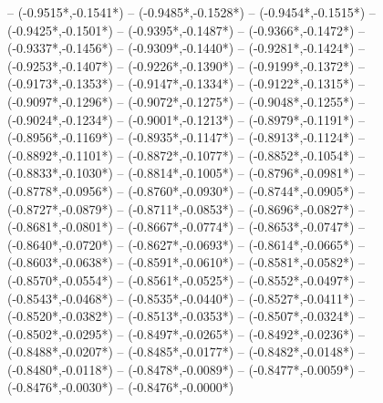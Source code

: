 {	-- ({-0.9515*\dx},{-0.1541*\dy})
	-- ({-0.9485*\dx},{-0.1528*\dy})
	-- ({-0.9454*\dx},{-0.1515*\dy})
	-- ({-0.9425*\dx},{-0.1501*\dy})
	-- ({-0.9395*\dx},{-0.1487*\dy})
	-- ({-0.9366*\dx},{-0.1472*\dy})
	-- ({-0.9337*\dx},{-0.1456*\dy})
	-- ({-0.9309*\dx},{-0.1440*\dy})
	-- ({-0.9281*\dx},{-0.1424*\dy})
	-- ({-0.9253*\dx},{-0.1407*\dy})
	-- ({-0.9226*\dx},{-0.1390*\dy})
	-- ({-0.9199*\dx},{-0.1372*\dy})
	-- ({-0.9173*\dx},{-0.1353*\dy})
	-- ({-0.9147*\dx},{-0.1334*\dy})
	-- ({-0.9122*\dx},{-0.1315*\dy})
	-- ({-0.9097*\dx},{-0.1296*\dy})
	-- ({-0.9072*\dx},{-0.1275*\dy})
	-- ({-0.9048*\dx},{-0.1255*\dy})
	-- ({-0.9024*\dx},{-0.1234*\dy})
	-- ({-0.9001*\dx},{-0.1213*\dy})
	-- ({-0.8979*\dx},{-0.1191*\dy})
	-- ({-0.8956*\dx},{-0.1169*\dy})
	-- ({-0.8935*\dx},{-0.1147*\dy})
	-- ({-0.8913*\dx},{-0.1124*\dy})
	-- ({-0.8892*\dx},{-0.1101*\dy})
	-- ({-0.8872*\dx},{-0.1077*\dy})
	-- ({-0.8852*\dx},{-0.1054*\dy})
	-- ({-0.8833*\dx},{-0.1030*\dy})
	-- ({-0.8814*\dx},{-0.1005*\dy})
	-- ({-0.8796*\dx},{-0.0981*\dy})
	-- ({-0.8778*\dx},{-0.0956*\dy})
	-- ({-0.8760*\dx},{-0.0930*\dy})
	-- ({-0.8744*\dx},{-0.0905*\dy})
	-- ({-0.8727*\dx},{-0.0879*\dy})
	-- ({-0.8711*\dx},{-0.0853*\dy})
	-- ({-0.8696*\dx},{-0.0827*\dy})
	-- ({-0.8681*\dx},{-0.0801*\dy})
	-- ({-0.8667*\dx},{-0.0774*\dy})
	-- ({-0.8653*\dx},{-0.0747*\dy})
	-- ({-0.8640*\dx},{-0.0720*\dy})
	-- ({-0.8627*\dx},{-0.0693*\dy})
	-- ({-0.8614*\dx},{-0.0665*\dy})
	-- ({-0.8603*\dx},{-0.0638*\dy})
	-- ({-0.8591*\dx},{-0.0610*\dy})
	-- ({-0.8581*\dx},{-0.0582*\dy})
	-- ({-0.8570*\dx},{-0.0554*\dy})
	-- ({-0.8561*\dx},{-0.0525*\dy})
	-- ({-0.8552*\dx},{-0.0497*\dy})
	-- ({-0.8543*\dx},{-0.0468*\dy})
	-- ({-0.8535*\dx},{-0.0440*\dy})
	-- ({-0.8527*\dx},{-0.0411*\dy})
	-- ({-0.8520*\dx},{-0.0382*\dy})
	-- ({-0.8513*\dx},{-0.0353*\dy})
	-- ({-0.8507*\dx},{-0.0324*\dy})
	-- ({-0.8502*\dx},{-0.0295*\dy})
	-- ({-0.8497*\dx},{-0.0265*\dy})
	-- ({-0.8492*\dx},{-0.0236*\dy})
	-- ({-0.8488*\dx},{-0.0207*\dy})
	-- ({-0.8485*\dx},{-0.0177*\dy})
	-- ({-0.8482*\dx},{-0.0148*\dy})
	-- ({-0.8480*\dx},{-0.0118*\dy})
	-- ({-0.8478*\dx},{-0.0089*\dy})
	-- ({-0.8477*\dx},{-0.0059*\dy})
	-- ({-0.8476*\dx},{-0.0030*\dy})
	-- ({-0.8476*\dx},{-0.0000*\dy})
}
